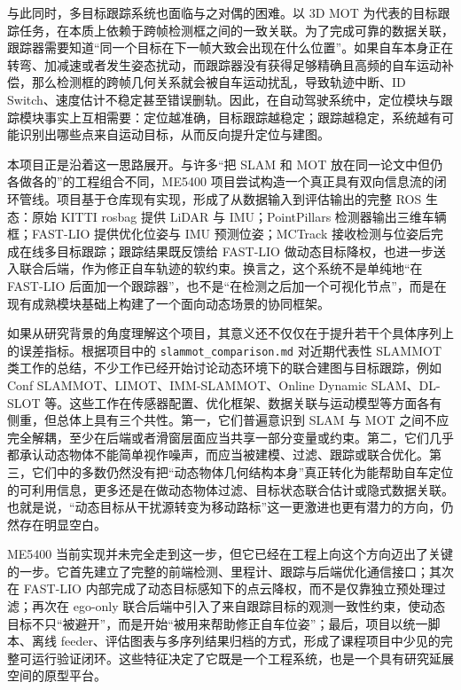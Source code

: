 \documentclass[UTF8,a4paper,12pt]{ctexart}
\begin{document}
与此同时，多目标跟踪系统也面临与之对偶的困难。以 3D MOT 为代表的目标跟踪任务，在本质上依赖于跨帧检测框之间的一致关联。为了完成可靠的数据关联，跟踪器需要知道“同一个目标在下一帧大致会出现在什么位置”。如果自车本身正在转弯、加减速或者发生姿态扰动，而跟踪器没有获得足够精确且高频的自车运动补偿，那么检测框的跨帧几何关系就会被自车运动扰乱，导致轨迹中断、ID Switch、速度估计不稳定甚至错误删轨。因此，在自动驾驶系统中，定位模块与跟踪模块事实上互相需要：定位越准确，目标跟踪越稳定；跟踪越稳定，系统越有可能识别出哪些点来自运动目标，从而反向提升定位与建图。

本项目正是沿着这一思路展开。与许多“把 SLAM 和 MOT 放在同一论文中但仍各做各的”的工程组合不同，ME5400 项目尝试构造一个真正具有双向信息流的闭环管线。项目基于仓库现有实现，形成了从数据输入到评估输出的完整 ROS 生态：原始 KITTI rosbag 提供 LiDAR 与 IMU；PointPillars 检测器输出三维车辆框；FAST-LIO 提供优化位姿与 IMU 预测位姿；MCTrack 接收检测与位姿后完成在线多目标跟踪；跟踪结果既反馈给 FAST-LIO 做动态目标降权，也进一步送入联合后端，作为修正自车轨迹的软约束。换言之，这个系统不是单纯地“在 FAST-LIO 后面加一个跟踪器”，也不是“在检测之后加一个可视化节点”，而是在现有成熟模块基础上构建了一个面向动态场景的协同框架。

如果从研究背景的角度理解这个项目，其意义还不仅仅在于提升若干个具体序列上的误差指标。根据项目中的 \texttt{slammot\_comparison.md} 对近期代表性 SLAMMOT 类工作的总结，不少工作已经开始讨论动态环境下的联合建图与目标跟踪，例如 Conf SLAMMOT、LIMOT、IMM-SLAMMOT、Online Dynamic SLAM、DL-SLOT 等。这些工作在传感器配置、优化框架、数据关联与运动模型等方面各有侧重，但总体上具有三个共性。第一，它们普遍意识到 SLAM 与 MOT 之间不应完全解耦，至少在后端或者滑窗层面应当共享一部分变量或约束。第二，它们几乎都承认动态物体不能简单视作噪声，而应当被建模、过滤、跟踪或联合优化。第三，它们中的多数仍然没有把“动态物体几何结构本身”真正转化为能帮助自车定位的可利用信息，更多还是在做动态物体过滤、目标状态联合估计或隐式数据关联。也就是说，“动态目标从干扰源转变为移动路标”这一更激进也更有潜力的方向，仍然存在明显空白。

ME5400 当前实现并未完全走到这一步，但它已经在工程上向这个方向迈出了关键的一步。它首先建立了完整的前端检测、里程计、跟踪与后端优化通信接口；其次在 FAST-LIO 内部完成了动态目标感知下的点云降权，而不是仅靠独立预处理过滤；再次在 ego-only 联合后端中引入了来自跟踪目标的观测一致性约束，使动态目标不只“被避开”，而是开始“被用来帮助修正自车位姿”；最后，项目以统一脚本、离线 feeder、评估图表与多序列结果归档的方式，形成了课程项目中少见的完整可运行验证闭环。这些特征决定了它既是一个工程系统，也是一个具有研究延展空间的原型平台。
\end{document}
